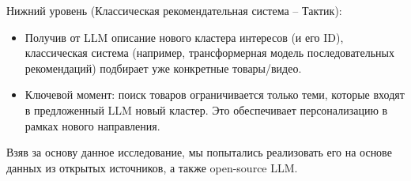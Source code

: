 Нижний уровень (Классическая рекомендательная система – Тактик):
\begin{itemize}
    \item Получив от LLM описание нового кластера интересов (и его ID), классическая система (например, трансформерная модель последовательных рекомендаций) подбирает уже конкретные товары/видео.
    \item Ключевой момент: поиск товаров ограничивается только теми, которые входят в предложенный LLM новый кластер. Это обеспечивает персонализацию в рамках нового направления.
\end{itemize}

Взяв за основу данное исследование, мы попытались реализовать его на основе данных из открытых источников, а также open-source LLM. 